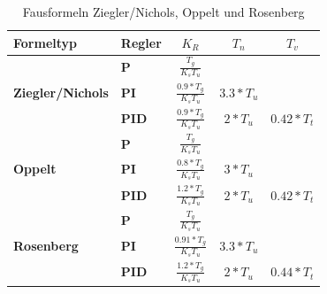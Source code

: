 \begin{table}[h]
\centering
\renewcommand*{\arraystretch}{1.7}
\begin{tabular}{|l|l|c|c|c|}
\hline 
\textbf{Formeltyp} & \textbf{Regler} & \textbf{$K_R$} & \textbf{$T_n$} & \textbf{$T_v$} \\ 
\hline 
 & \textbf{P} & $\frac{T_g}{K_sT_u}$ &  &  \\ 
\cline{2-5} 
\textbf{Ziegler/Nichols}&\textbf{PI} & $\frac{0.9*T_g}{K_sT_u}$ & $3.3*T_u$ &  \\ 
\cline{2-5} 
&\textbf{PID} & $\frac{0.9*T_g}{K_sT_u}$ & $2*T_u$ & $0.42*T_t$ \\ 
\hline 

&\textbf{P} & $\frac{T_g}{K_sT_u}$ &  &  \\ 
\cline{2-5} 
\textbf{Oppelt} &\textbf{PI} & $\frac{0.8*T_g}{K_sT_u}$ & $3*T_u$ &  \\ 
\cline{2-5} 
&\textbf{PID} & $\frac{1.2*T_g}{K_sT_u}$ & $2*T_u$ & $0.42*T_t$ \\ 
\hline 

&\textbf{P} & $\frac{T_g}{K_sT_u}$ &  &  \\ 
\cline{2-5} 
\textbf{Rosenberg} &\textbf{PI} & $\frac{0.91*T_g}{K_sT_u}$ & $3.3*T_u$ &  \\ 
\cline{2-5}  
&\textbf{PID} & $\frac{1.2*T_g}{K_sT_u}$ & $2*T_u$ & $0.44*T_t$ \\ 
\hline 

\end{tabular} 
\renewcommand*{\arraystretch}{1}
\caption{Fausformeln Ziegler/Nichols, Oppelt und Rosenberg}
\end{table}

